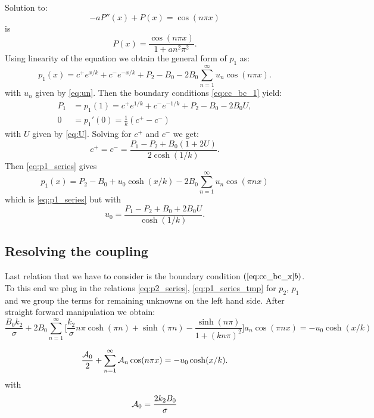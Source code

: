 \documentclass[a4paper,10pt]{article}
\begin{document}
Solution to:
\[
    - a P''(x) + P(x) = \cos(n \pi x) 
\]    
is 
\[
    P(x) = \frac{\cos(n \pi x)}{1+an^2\pi^2}.
\]
Using linearity of the equation we obtain the general form of $p_1$ as:
\begin {equation}
    \label{eq:p1_series}        
    p_1(x) = c^+ e^{x/k} + c^- e^{-x/k} + P_2 - B_0 
    - 2 B_0 \sum^{\infty}_{n=1} u_n \cos (n\pi x).
\end {equation}
with $u_n$ given by \eqref{eq:un}. Then the boundary conditions \eqref{eq:cc_bc_1} yield:
\begin{align*}
P_1 &= p_1(1) = c^+e^{1/k} + c^- e^{-1/k} + P_2 - B_0 - 2 B_0 U, \\
0 &= p_1'(0) = \frac{1}{k}(c^+ - c^-) 
\end{align*}
with $U$ given by \eqref{eq:U}. Solving for $c^+$ and $c^-$ we get:
\[
  c^+ = c^- = \frac{P_1 - P_2 + B_0(1 + 2 U)}{2\cosh(1/k)}.
\]
Then \eqref{eq:p1_series} gives 
\begin{equation}
    \label{eq:p1_series_tmp}
    p_1(x) = P_2 -  B_0 + u_0 \cosh(x/k) - 2B_0 \sum_{n=1}^\infty  u_n \cos(\pi n x) 
\end{equation}
which is \eqref{eq:p1_series} but with 
\begin{equation}
    \label{eq:u0_def}    
    u_0 = \frac{P_1 - P_2 + B_0 + 2 B_0 U}{\cosh(1/k)}.
\end{equation}



\subsection{Resolving the coupling}
\label{sec:cont_coupling}

Last relation that we have to consider is the boundary condition $(\ref{eq:cc_bc_x}b)$. To this end we plug in the relations \eqref{eq:p2_series}, 
\eqref{eq:p1_series_tmp} for $p_2$, $p_1$  and we group the terms for remaining unknowns on the left hand side. After straight forward
manipulation we obtain:
 \[
     \frac{B_0 k_2}{\sigma} + 2 B_0 \sum_{n=1}^\infty 
         \Big[ \frac{k_2}{\sigma} n\pi  \cosh(\pi n) 
         + \sinh(\pi n)
         - \frac{\sinh(n \pi)}{1 + (k n \pi)^2} 
         \Big] a_n
         \cos(\pi n x)        
        = - u_0 \cosh(x/k) 
 \]



\begin{equation}
    \label{eq:fourier_coupling}
    \frac{{\cal A}_0}{2} + \sum^{\infty}_{n=1} {\cal A}_n \cos (n\pi x) =  - u_0 \cosh(x/k).
\end{equation}
with
\begin{equation}
    \label{eq:fourier_A0}
    {\cal A}_0 = \frac{2 k_2 B_0}{\sigma} 
\end{equation}
\end{document}
